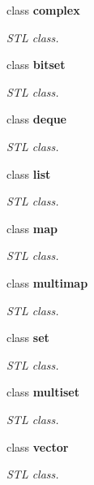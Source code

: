 \begin{CompactItemize}
class \textbf{complex}
\begin{CompactList}\small\item\em STL class. \item\end{CompactList}\item 
class \textbf{bitset}
\begin{CompactList}\small\item\em STL class. \item\end{CompactList}\item 
class \textbf{deque}
\begin{CompactList}\small\item\em STL class. \item\end{CompactList}\item 
class \textbf{list}
\begin{CompactList}\small\item\em STL class. \item\end{CompactList}\item 
class \textbf{map}
\begin{CompactList}\small\item\em STL class. \item\end{CompactList}\item 
class \textbf{multimap}
\begin{CompactList}\small\item\em STL class. \item\end{CompactList}\item 
class \textbf{set}
\begin{CompactList}\small\item\em STL class. \item\end{CompactList}\item 
class \textbf{multiset}
\begin{CompactList}\small\item\em STL class. \item\end{CompactList}\item 
class \textbf{vector}
\begin{CompactList}\small\item\em STL class. \item\end{CompactList}\item 

\end{CompactItemize}
